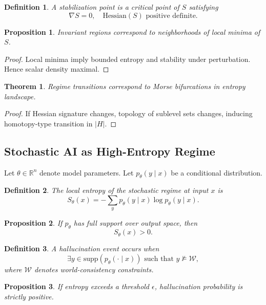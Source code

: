 \documentclass[12pt]{article}
\newtheorem{proposition}{Proposition}
\newtheorem{theorem}{Theorem}
\newtheorem{definition}{Definition}
\begin{document}
\begin{definition}
A stabilization point is a critical point of $S$ satisfying
\[
\nabla S = 0, \quad \text{Hessian}(S) \text{ positive definite}.
\]
\end{definition}

\begin{proposition}
Invariant regions correspond to neighborhoods of local minima of $S$.
\end{proposition}

\begin{proof}
Local minima imply bounded entropy and stability under perturbation. Hence scalar density maximal.
\end{proof}

\begin{theorem}
Regime transitions correspond to Morse bifurcations in entropy landscape.
\end{theorem}

\begin{proof}
If Hessian signature changes, topology of sublevel sets changes, inducing homotopy-type transition in $|H|$.
\end{proof}

\subsection{Stochastic AI as High-Entropy Regime}

Let $\theta \in \mathbb{R}^n$ denote model parameters. Let $p_\theta(y \mid x)$ be a conditional distribution.

\begin{definition}
The local entropy of the stochastic regime at input $x$ is
\[
S_\theta(x) = - \sum_y p_\theta(y \mid x) \log p_\theta(y \mid x).
\]
\end{definition}

\begin{proposition}
If $p_\theta$ has full support over output space, then
\[
S_\theta(x) > 0.
\]
\end{proposition}

\begin{definition}
A hallucination event occurs when
\[
\exists y \in \text{supp}(p_\theta(\cdot \mid x)) \text{ such that } y \not\models \mathcal{W},
\]
where $\mathcal{W}$ denotes world-consistency constraints.
\end{definition}

\begin{proposition}
If entropy exceeds a threshold $\epsilon$, hallucination probability is strictly positive.
\end{proposition}
\end{document}
